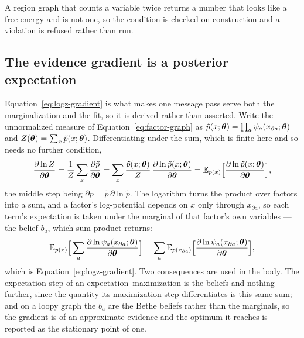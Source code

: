 \documentclass[11pt,a4paper]{article}
\begin{document}
A region graph that counts a variable twice returns a number that looks like a
free energy and is not one, so the condition is checked on construction and a
violation is refused rather than run.

\subsection{The evidence gradient is a posterior expectation}
\label{app:logz}
Equation~\ref{eq:logz-gradient} is what makes one message pass serve both the
marginalization and the fit, so it is derived rather than asserted. Write the
unnormalized measure of Equation~\ref{eq:factor-graph} as
$\tilde p(x; \boldsymbol{\theta}) = \prod_a \psi_a(x_{\partial a}; \boldsymbol{\theta})$ and
$Z(\boldsymbol{\theta}) = \sum_x \tilde p(x; \boldsymbol{\theta})$. Differentiating under the sum,
which is finite here and so needs no further condition,
\begin{equation}
  \frac{\partial \ln Z}{\partial \boldsymbol{\theta}}
    = \frac{1}{Z} \sum_x \frac{\partial \tilde p}{\partial \boldsymbol{\theta}}
    = \sum_x \frac{\tilde p(x; \boldsymbol{\theta})}{Z}\,
      \frac{\partial \ln \tilde p(x; \boldsymbol{\theta})}{\partial \boldsymbol{\theta}}
    = \mathbb{E}_{p(x)}\Big[
        \frac{\partial \ln \tilde p(x; \boldsymbol{\theta})}{\partial \boldsymbol{\theta}}
      \Big],
  \label{eq:logz-expectation}
\end{equation}
the middle step being $\partial \tilde p = \tilde p \, \partial \ln
\tilde p$. The logarithm turns the product over factors into a sum, and a
factor's log-potential depends on $x$ only through $x_{\partial a}$, so each
term's expectation is taken under the marginal of that factor's own variables
--- the belief $b_a$, which sum-product returns:
\begin{equation}
  \mathbb{E}_{p(x)}\Big[
      \sum_a \frac{\partial \ln \psi_a(x_{\partial a}; \boldsymbol{\theta})}
                   {\partial \boldsymbol{\theta}} \Big]
    = \sum_a \mathbb{E}_{p(x_{\partial a})}
      \Big[ \frac{\partial \ln \psi_a(x_{\partial a}; \boldsymbol{\theta})}
                  {\partial \boldsymbol{\theta}} \Big],
\end{equation}
which is Equation~\ref{eq:logz-gradient}. Two consequences are used in the
body. The expectation step of an expectation--maximization is the beliefs and
nothing further, since the quantity its maximization step differentiates is
this same sum; and on a loopy graph the $b_a$ are the Bethe beliefs rather
than the marginals, so the gradient is of an approximate evidence and the
optimum it reaches is reported as the stationary point of one.
\end{document}
